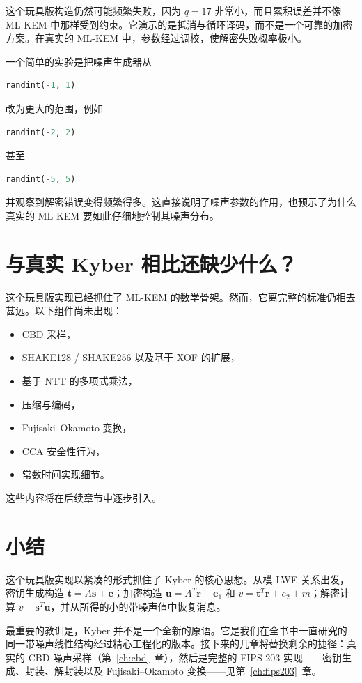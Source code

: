 这个玩具版构造仍然可能频繁失败，因为 $q=17$ 非常小，而且累积误差并不像 ML-KEM 中那样受到约束。它演示的是抵消与循环译码，而不是一个可靠的加密方案。在真实的 ML-KEM 中，参数经过调校，使解密失败概率极小。

一个简单的实验是把噪声生成器从

\begin{lstlisting}[language=Python]
randint(-1, 1)
\end{lstlisting}

改为更大的范围，例如

\begin{lstlisting}[language=Python]
randint(-2, 2)
\end{lstlisting}

甚至

\begin{lstlisting}[language=Python]
randint(-5, 5)
\end{lstlisting}

并观察到解密错误变得频繁得多。这直接说明了噪声参数的作用，也预示了为什么真实的 ML-KEM 要如此仔细地控制其噪声分布。

\section{与真实 Kyber 相比还缺少什么？}

这个玩具版实现已经抓住了 ML-KEM 的数学骨架。然而，它离完整的标准仍相去甚远。以下组件尚未出现：

\begin{itemize}
    \item CBD 采样，
    \item SHAKE128 / SHAKE256 以及基于 XOF 的扩展，
    \item 基于 NTT 的多项式乘法，
    \item 压缩与编码，
    \item Fujisaki–Okamoto 变换，
    \item CCA 安全性行为，
    \item 常数时间实现细节。
\end{itemize}

这些内容将在后续章节中逐步引入。

\section{小结}

这个玩具版实现以紧凑的形式抓住了 Kyber 的核心思想。从模 LWE 关系出发，密钥生成构造 $\mathbf{t}=A\mathbf{s}+\mathbf{e}$；加密构造 $\mathbf{u}=A^{T}\mathbf{r}+\mathbf{e}_1$ 和 $v=\mathbf{t}^{T}\mathbf{r}+e_2+m$；解密计算 $v-\mathbf{s}^{T}\mathbf{u}$，并从所得的小的带噪声值中恢复消息。

最重要的教训是，Kyber 并不是一个全新的原语。它是我们在全书中一直研究的同一带噪声线性结构经过精心工程化的版本。接下来的几章将替换剩余的捷径：真实的 CBD 噪声采样（第~\ref{ch:cbd}~章），然后是完整的 FIPS 203 实现——密钥生成、封装、解封装以及 Fujisaki–Okamoto 变换——见第~\ref{ch:fips203}~章。

\printbibliography[heading=chapterrefs]
